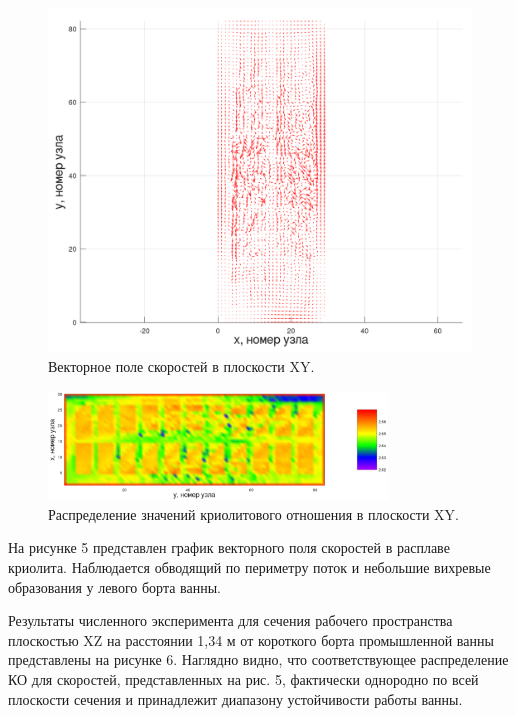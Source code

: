 \documentclass{article}
\begin{document}
\begin{figure}[H]
    \centering
    \includegraphics[width=200mm]{veloxy_art.png}
    \caption{Векторное поле скоростей в плоскости XY.}
    \label{fig:3dxyvelo1} 
\end{figure}

\begin{figure}[H]
    \centering
    \includegraphics[width=90mm]{3d xy cr.png}
    \caption{Распределение значений криолитового отношения в плоскости XY.}
    \label{fig:3dxycr1} 
\end{figure}

На рисунке 5 представлен график векторного поля скоростей в расплаве криолита. Наблюдается обводящий по периметру поток и небольшие вихревые образования у левого борта ванны.

Результаты численного эксперимента для сечения рабочего пространства плоскостью XZ на расстоянии 1,34 м от короткого борта промышленной ванны представлены на рисунке 6. Наглядно видно, что соответствующее распределение КО для скоростей, представленных на рис. 5, фактически однородно по всей плоскости сечения и принадлежит диапазону устойчивости работы ванны. 
\end{document}
